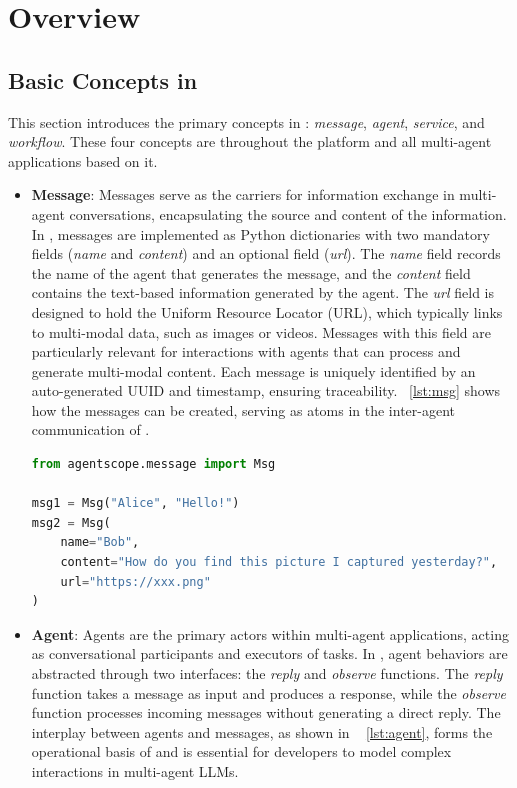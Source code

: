 
\section{Overview}
\label{sec:overview}

\subsection{Basic Concepts in \ours}
\label{sec:concept}

This section introduces the primary concepts in \ours: {\it message}, {\it agent}, {\it service}, and {\it workflow}.
These four concepts are throughout the platform and all multi-agent applications based on it. 

\begin{itemize}
\item \textbf{Message}:
Messages serve as the carriers for information exchange in multi-agent conversations, encapsulating the source and content of the information. In \ours, messages are implemented as Python dictionaries with two mandatory fields (\textit{name} and \textit{content}) and an optional field (\textit{url}). 
The \textit{name} field records the name of the agent that generates the message, and the \textit{content} field contains the text-based information generated by the agent.
The \textit{url} field is designed to hold the Uniform Resource Locator (URL), which typically links to multi-modal data, such as images or videos.
Messages with this field are particularly relevant for interactions with agents that can process and generate multi-modal content. 
Each message is uniquely identified by an auto-generated UUID and timestamp, ensuring traceability. 
\lstlistingname~\ref{lst:msg} shows how the messages can be created, 
serving as atoms in the inter-agent communication of \ours.

\begin{lstlisting}[language=Python, caption={Illustrative examples of message creation in \ours.}, label={lst:msg}, float=h]
from agentscope.message import Msg

msg1 = Msg("Alice", "Hello!")
msg2 = Msg(
    name="Bob",
    content="How do you find this picture I captured yesterday?",
    url="https://xxx.png"
)
\end{lstlisting}

\item \textbf{Agent}: 
Agents are the primary actors within multi-agent applications, acting as conversational participants and executors of tasks. In \ours, agent behaviors are abstracted through two interfaces: the \textit{reply} and \textit{observe} functions. The \textit{reply} function takes a message as input and produces a response, while the \textit{observe} function processes incoming messages without generating a direct reply. 
The interplay between agents and messages, as shown in \lstlistingname~ \ref{lst:agent}, forms the operational basis of \ours and is essential for developers to model complex interactions in multi-agent LLMs.


\end{itemize}
